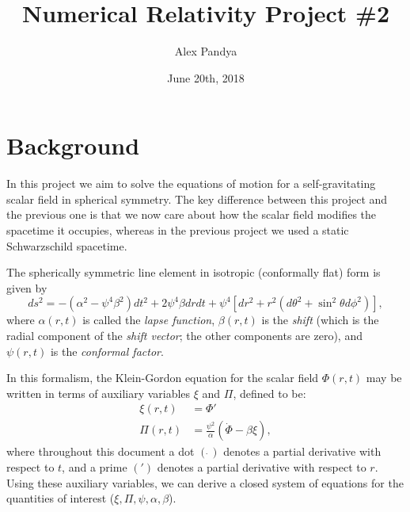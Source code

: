 \documentclass[12pt]{article}
\numberwithin{equation}{section}
\begin{document}
	\title{Numerical Relativity Project \#2}
	\author{Alex Pandya}
	\date{June 20th, 2018}
	\maketitle

\section{Background}
In this project we aim to solve the equations of motion for a self-gravitating scalar field in spherical symmetry.  The key difference between this project and the previous one is that we now care about how the scalar field modifies the spacetime it occupies, whereas in the previous project we used a static Schwarzschild spacetime.

The spherically symmetric line element in isotropic (conformally flat) form is given by
\begin{equation} \label{eq:line_element}
ds^2 = -(\alpha^2 - \psi^4 \beta^2) dt^2 + 2 \psi^4 \beta dr dt + \psi^4 [dr^2 + r^2 (d\theta^2 + \sin^2 \theta d\phi^2)],
\end{equation}
where $\alpha(r, t)$ is called the \textit{lapse function}, $\beta(r, t)$ is the \textit{shift} (which is the radial component of the \textit{shift vector}; the other components are zero), and $\psi(r, t)$ is the \textit{conformal factor}.

In this formalism, the Klein-Gordon equation for the scalar field $\Phi(r, t)$ may be written in terms of auxiliary variables $\xi$ and $\Pi$, defined to be:
\begin{align}
\xi(r, t) &= \Phi' \label{eq:xi_defn} \\
\Pi(r, t) &= \frac{\psi^2}{\alpha}(\dot{\Phi} - \beta \xi), \label{eq:Pi_defn} 
\end{align}
where throughout this document a dot $(\dot{~})$ denotes a partial derivative with respect to $t$, and a prime $(')$ denotes a partial derivative with respect to $r$.  Using these auxiliary variables, we can derive a closed system of equations for the quantities of interest ($\xi, \Pi, \psi, \alpha, \beta$).
\end{document}
